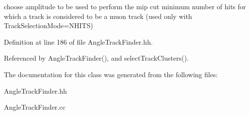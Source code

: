 choose amplitude to be used to perform the mip cut minimum number of hits for which a track is considered to be a muon track (used only with TrackSelectionMode=NHITS) 

Definition at line 186 of file AngleTrackFinder.hh.

Referenced by AngleTrackFinder(), and selectTrackClusters().

The documentation for this class was generated from the following files:\begin{DoxyCompactItemize}
\item 
AngleTrackFinder.hh\item 
AngleTrackFinder.cc\end{DoxyCompactItemize}
